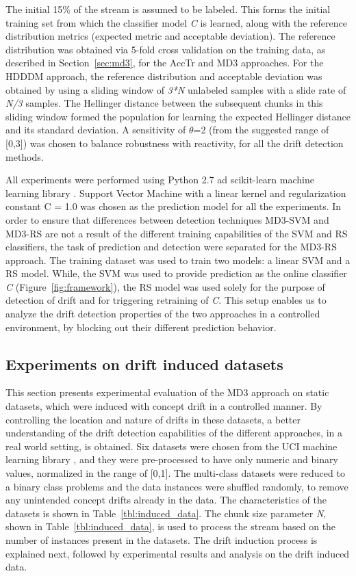 \documentclass[authoryear,3p,times,twocolumn]{elsarticle}
\begin{document}
The initial 15\% of the stream is assumed to be labeled. This forms the initial training set from which the classifier model \textit{C} is learned, along with the reference distribution metrics (expected metric and acceptable deviation). The reference distribution was obtained via 5-fold cross validation on the training data, as described in Section~\ref{sec:md3}, for the AccTr and MD3 approaches.  For the HDDDM approach, the reference distribution and acceptable deviation was obtained by using a sliding window of \textit{3*N} unlabeled samples with a slide rate of \textit{N/3} samples. The Hellinger distance between the subsequent chunks in this sliding window formed the population for learning the expected Hellinger distance and its standard deviation. A sensitivity of $\theta$=2 (from the suggested range of [0,3]) was chosen to balance robustness with reactivity, for all the drift detection methods.

All experiments were performed using Python 2.7 ad scikit-learn machine learning library \citep{scikit-learn}. Support Vector Machine with a linear kernel and regularization constant C = 1.0 was chosen as the prediction model for all the experiments. In order to ensure that differences between detection techniques MD3-SVM and MD3-RS are not a result of the different training capabilities of the SVM and RS classifiers, the task of prediction and detection were separated for the  MD3-RS approach. The training dataset was used to train two models: a linear SVM and a RS model. While, the SVM was used to provide prediction as the online classifier \textit{C} (Figure~\ref{fig:framework}), the RS model was used solely for the purpose of detection of drift and for triggering retraining of \textit{C}. This setup enables us to analyze the drift detection properties of the two approaches in a controlled environment, by blocking out their different prediction behavior. 


\subsection{Experiments on drift induced datasets}
\label{sec:driftinduced}

This section presents experimental evaluation of the MD3 approach on static datasets, which were induced with concept drift in a controlled manner. By controlling the location and nature of drifts in these datasets, a better understanding of the drift detection capabilities of the different approaches, in a real world setting, is obtained. Six datasets were chosen from the UCI machine learning library \citep{Lichman:2013}, and they were pre-processed to have only numeric and binary values, normalized in the range of [0,1]. The multi-class datasets were reduced to a binary class problems and the data instances were shuffled randomly, to remove any unintended concept drifts already in the data. The characteristics of the datasets is shown in Table~\ref{tbl:induced_data}. The chunk size parameter \textit{N}, shown in Table~\ref{tbl:induced_data}, is used to process the stream based on the number of instances present in the datasets. The drift induction process is explained next, followed by experimental results and analysis on the drift induced data. 
\end{document}

